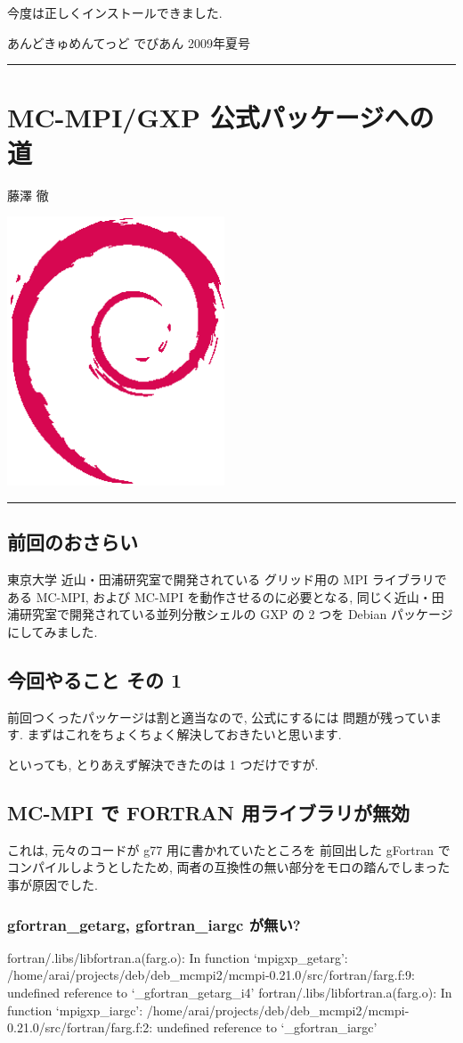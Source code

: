 \documentclass[mingoth,a4paper]{jsarticle}
\renewcommand{\dancersection}[2]{%
\newpage
あんどきゅめんてっど でびあん 2009年夏号
%
\vspace{0.1mm}\\
{\color{dancerlightblue}\rule{\hsize}{2mm}}

%
%
\begin{minipage}[t]{0.6\hsize}
\color{dancerdarkblue}
\vspace{1cm}
\section{#1}
\hfill{}#2\\
\end{minipage}
\begin{minipage}[t]{0.4\hsize}
\vspace{-2cm}
\hfill{}\includegraphics[height=8cm]{image200502/openlogo-nd.eps}\\
\vspace{-5cm}
\end{minipage}
%
%
{\color{dancerdarkblue}\rule{0.74\hsize}{2mm}}
%
\vspace{2cm}
}
\begin{document}
\begin{commandline}
今度は正しくインストールできました.

\dancersection{MC-MPI/GXP 公式パッケージへの道}{藤澤 徹}

\subsection{前回のおさらい}

東京大学 近山・田浦研究室で開発されている
グリッド用の MPI ライブラリである MC-MPI,
および MC-MPI を動作させるのに必要となる,
同じく近山・田浦研究室で開発されている並列分散シェルの GXP
の 2 つを Debian パッケージにしてみました.

\subsection{今回やること その 1}

前回つくったパッケージは割と適当なので, 公式にするには
問題が残っています. まずはこれをちょくちょく解決しておきたいと思います.

といっても, とりあえず解決できたのは 1 つだけですが.

\subsection{MC-MPI で FORTRAN 用ライブラリが無効}

これは, 元々のコードが g77 用に書かれていたところを
前回出した gFortran でコンパイルしようとしたため,
両者の互換性の無い部分をモロの踏んでしまった事が原因でした.

\subsubsection{gfortran\_getarg, gfortran\_iargc が無い?}

\begin{commandline}
fortran/.libs/libfortran.a(farg.o): In function `mpigxp_getarg':
/home/arai/projects/deb/deb_mcmpi2/mcmpi-0.21.0/src/fortran/farg.f:9: 
 undefined reference to `_gfortran_getarg_i4'
fortran/.libs/libfortran.a(farg.o): In function `mpigxp_iargc':
/home/arai/projects/deb/deb_mcmpi2/mcmpi-0.21.0/src/fortran/farg.f:2: 
 undefined reference to `_gfortran_iargc'
\end{commandline}


\end{commandline}
\end{document}
